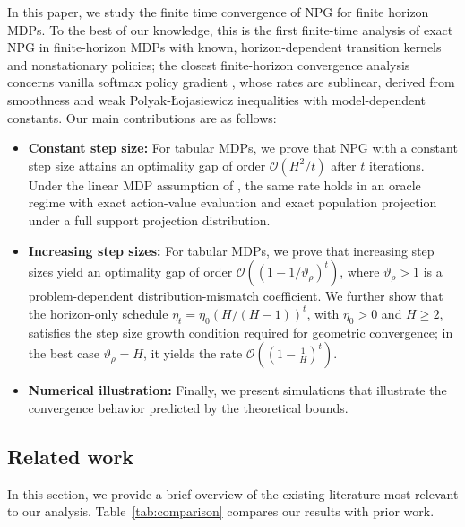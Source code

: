 \documentclass[11pt]{article}
\begin{document}
In this paper, we study the finite time convergence of NPG for finite horizon MDPs. To the best of our knowledge, this is the first finite-time analysis of
exact NPG in finite-horizon MDPs with known, horizon-dependent transition
kernels and nonstationary policies; the closest finite-horizon convergence analysis concerns vanilla softmax policy gradient
\citep{klein2024beyond}, whose rates are sublinear, derived from smoothness and
weak Polyak-{\L}ojasiewicz inequalities with model-dependent
constants. Our main
contributions are as follows:
\begin{itemize}
    \item \textbf{Constant step size:}
    For tabular MDPs, we prove that NPG with a constant step size attains an
    optimality gap of order $\mathcal{O}(H^2/t)$ after $t$ iterations. Under
    the linear MDP assumption of \citep{jin2020provably}, the same rate holds in
    an oracle regime with exact action-value evaluation and exact
    population projection under a full support projection distribution.

    \item \textbf{Increasing step sizes:}
    For tabular MDPs, we prove that increasing step sizes yield an optimality
    gap of order
    $\mathcal{O}((1-1/\vartheta_\rho)^t)$, where $\vartheta_\rho>1$ is a
    problem-dependent distribution-mismatch coefficient. We further show that the horizon-only schedule
$\eta_t=\eta_0(H/(H-1))^t$, with $\eta_0>0$ and $H \geq 2$, satisfies the step size growth
condition required for geometric convergence; in the best case
$\vartheta_\rho=H$, it yields the rate
$\mathcal{O}\!\left(\left(1-\frac{1}{H}\right)^t\right)$.

    \item \textbf{Numerical illustration:} Finally, we present 
    simulations that illustrate the convergence behavior predicted by the
    theoretical bounds.
\end{itemize}
\subsection{Related work}\label{sec:Related_work}

 In this section, we provide a brief overview of the existing literature most
relevant to our analysis. Table~\ref{tab:comparison} compares our results with prior work.
\end{document}

